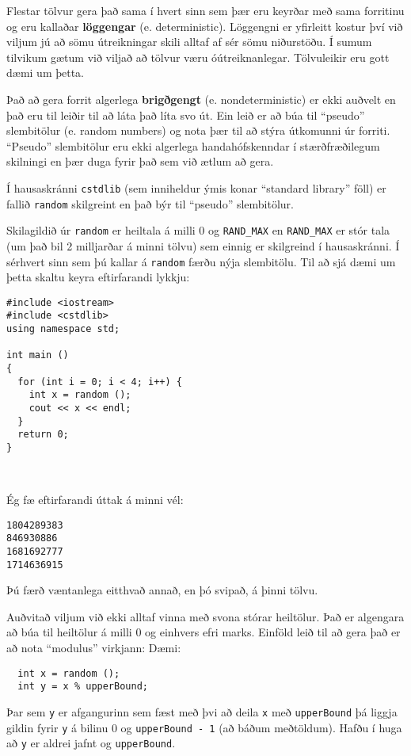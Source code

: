 Flestar tölvur gera það sama í hvert sinn sem þær eru keyrðar með sama forritinu og eru kallaðar {\bf löggengar} (e. deterministic). 
Löggengni er yfirleitt kostur því við viljum jú að sömu útreikningar skili alltaf af sér sömu niðurstöðu.
Í sumum tilvikum gætum við viljað að tölvur væru óútreiknanlegar.  Tölvuleikir eru gott dæmi um þetta.

Það að gera forrit algerlega {\bf brigðgengt} (e. nondeterministic) er ekki auðvelt en það eru til leiðir til að láta það líta svo út.
Ein leið er að búa til ``pseudo'' slembitölur (e. random numbers) og nota þær til að stýra útkomunni úr forriti.
``Pseudo'' slembitölur eru ekki algerlega handahófskenndar í stærðfræðilegum skilningi en þær duga fyrir það sem við ætlum að gera.

Í hausaskránni {\tt cstdlib} (sem inniheldur ýmis konar ``standard library'' föll) er fallið {\tt random} skilgreint en það býr til ``pseudo'' slembitölur.

Skilagildið úr {\tt random} er heiltala á milli 0 og {\tt RAND\_MAX}
en {\tt RAND\_MAX} er stór tala (um það bil 2 milljarðar á minni tölvu) sem einnig er skilgreind í hausaskránni.
Í sérhvert sinn sem þú kallar á {\tt random} færðu nýja slembitölu.
Til að sjá dæmi um þetta skaltu keyra eftirfarandi lykkju:

\begin{verbatim}
#include <iostream>
#include <cstdlib>
using namespace std;

int main ()
{
  for (int i = 0; i < 4; i++) {
    int x = random ();
    cout << x << endl;
  }
  return 0;
}

  
\end{verbatim}
%
Ég fæ eftirfarandi úttak á minni vél: 

\begin{verbatim}
1804289383
846930886
1681692777
1714636915
\end{verbatim}
%
Þú færð væntanlega eitthvað annað, en þó svipað, á þinni tölvu.

Auðvitað viljum við ekki alltaf vinna með svona stórar heiltölur.
Það er algengara að búa til heiltölur á milli 0 og einhvers efri marks.
Einföld leið til að gera það er að nota ``modulus'' virkjann:
Dæmi:

\begin{verbatim}
  int x = random ();
  int y = x % upperBound;
\end{verbatim}
%
Þar sem {\tt y} er afgangurinn sem fæst með þvi að deila {\tt x} með {\tt upperBound} þá liggja gildin fyrir {\tt y} á bilinu 0 og {\tt upperBound - 1} (að báðum meðtöldum).
Hafðu í huga að {\tt y} er aldrei jafnt og {\tt upperBound}.

